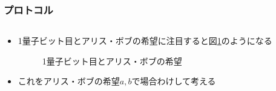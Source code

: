 \begin{frame}
  \frametitle{プロトコル}

  \begin{columns}
    \begin{column}{0.5\textwidth}
    \end{column}
    \begin{column}{0.5\textwidth}
    \end{column}
  \end{columns}

  \begin{itemize}
    \item 1量子ビット目とアリス・ボブの希望に注目すると図\ref{fig:1st_qubit}のようになる
    \begin{figure}
      \centering
      \caption{1量子ビット目とアリス・ボブの希望}
      \label{fig:1st_qubit}
    \end{figure}

    \item これをアリス・ボブの希望$a, b$で場合わけして考える
  \end{itemize}
\end{frame}

